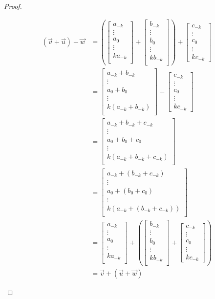 \documentclass[11pt]{article}
\newcommand{\vect}[1]{\begin{bmatrix}#1\end{bmatrix}}
\begin{document}
\begin{enumerate}[label=\arabic*.]
\begin{proof}
\begin{enumerate}
        \begin{align*}
        (\vec{v}+\vec{u})+\vec{w} 
        &= \left(\vect{a_{-k} \\ \vdots \\a_0 \\ \vdots \\ k a_{-k} \\} + \vect{b_{-k} \\ \vdots \\b_0 \\ \vdots \\ k b_{-k} \\}\right) +  \vect{c_{-k} \\ \vdots \\c_0 \\ \vdots \\ k c_{-k}}\\
        &= \vect{a_{-k}+b_{-k} \\ \vdots \\a_0+b_0 \\ \vdots \\ k(a_{-k}+ b_{-k}) \\}  + \vect{c_{-k} \\ \vdots \\c_0 \\ \vdots \\ k c_{-k}}\\
        &= \vect{a_{-k}+b_{-k}+c_{-k} \\ \vdots \\a_0+b_0+c_0 \\ \vdots \\ k(a_{-k}+ b_{-k} + c_{-k}) \\} \\
        &= \vect{a_{-k}+(b_{-k}+c_{-k}) \\ \vdots \\a_0+(b_0+c_0) \\ \vdots \\ k(a_{-k}+(b_{-k} + c_{-k})) \\} \\
        &= \vect{a_{-k} \\ \vdots \\a_0 \\ \vdots \\ k a_{-k} \\} + \left( \vect{b_{-k} \\ \vdots \\b_0 \\ \vdots \\ k b_{-k} \\} +  \vect{c_{-k} \\ \vdots \\c_0 \\ \vdots \\ k c_{-k}} \right) \\
        &=\vec{v}+(\vec{u}+\vec{w})
        \end{align*}
        

\end{enumerate}
\end{proof}
\end{enumerate}
\end{document}
